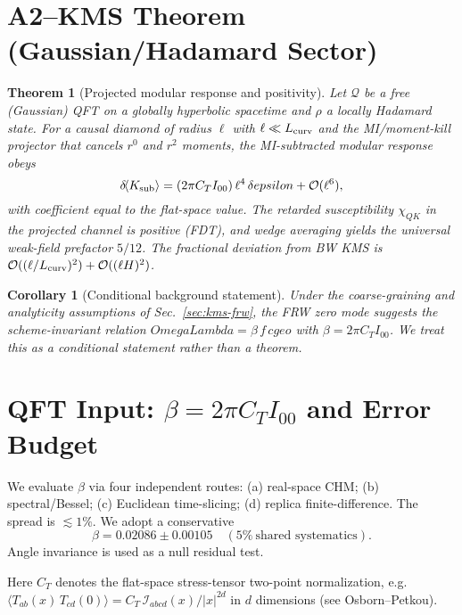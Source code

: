\documentclass[aps,prd,onecolumn,superscriptaddress,nofootinbib]{revtex4-2}
\def\OmL{OmegaLambda}%
\def\cgeo{cgeo}%
\def\eps{epsilon}%
\def\Omega_\Lambda{OmegaLambda}%
\providecommand{\OmL}{\Omega_\Lambda}
\providecommand{\cgeo}{c_{\rm geo}}
\providecommand{\eps}{\varepsilon}
\providecommand{\be}{\begin{equation}}
\providecommand{\ee}{\end{equation}}
\newtheorem{theorem}{Theorem}
\newtheorem{corollary}{Corollary}
\begin{document}
\section{A2–KMS Theorem (Gaussian/Hadamard Sector)}
\label{sec:theorem}

\begin{theorem}[Projected modular response and positivity]\label{thm:proj-modresp}
Let \(\mathcal Q\) be a free (Gaussian) QFT on a globally hyperbolic spacetime and \(\rho\) a locally Hadamard state. For a causal diamond of radius \(\ell\) with \(\ell\ll L_{\rm curv}\) and the MI/moment-kill projector that cancels \(r^0\) and \(r^2\) moments, the MI-subtracted modular response obeys
\be
\delta\!\langle K_{\rm sub}\rangle=(2\pi C_T I_{00})\,\ell^4\,\delta\eps+\mathcal O(\ell^6),
\ee
with coefficient equal to the flat-space value. The retarded susceptibility \(\chi_{QK}\) in the projected channel is positive (FDT), and wedge averaging yields the universal weak-field prefactor \(5/12\). The fractional deviation from BW KMS is \(\mathcal O((\ell/L_{\rm curv})^2)+\mathcal O((\ell H)^2)\).
\end{theorem}

\begin{corollary}[Conditional background statement]\label{cor:background-cond}
Under the coarse-graining and analyticity assumptions of Sec.~\ref{sec:kms-frw}, the FRW zero mode \emph{suggests} the scheme-invariant relation
\(\OmL=\beta\,f\,\cgeo\) with \(\beta=2\pi C_T I_{00}\). We treat this as a conditional statement rather than a theorem.
\end{corollary}

\section{QFT Input: \texorpdfstring{$\beta=2\pi C_T I_{00}$}{beta} and Error Budget}
\label{sec:beta}
We evaluate \(\beta\) via four independent routes: (a) real-space CHM; (b) spectral/Bessel; (c) Euclidean time-slicing; (d) replica finite-difference. The spread is \(\lesssim 1\%\). We adopt a conservative
\be
\beta=0.02086\pm 0.00105 \quad (5\%~\text{shared systematics}).
\ee
Angle invariance is used as a null residual test.

\noindent Here \(C_T\) denotes the flat-space stress-tensor two-point normalization, e.g.
\(\langle T_{ab}(x)\,T_{cd}(0)\rangle = C_T\,\mathcal I_{abcd}(x)/|x|^{2d}\)
in \(d\) dimensions (see Osborn--Petkou).
\end{document}
